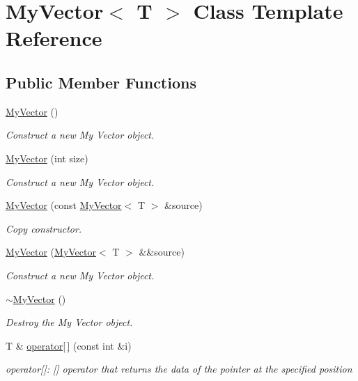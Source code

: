 \hypertarget{class_my_vector}{}\section{My\+Vector$<$ T $>$ Class Template Reference}
\label{class_my_vector}
\subsection*{Public Member Functions}
\begin{DoxyCompactItemize}
\item 
\mbox{\hyperlink{class_my_vector_ac356762c5ced52c0d934476cef32e472}{My\+Vector}} ()
\begin{DoxyCompactList}\small\item\em Construct a new My Vector object. \end{DoxyCompactList}\item 
\mbox{\hyperlink{class_my_vector_a9f780e2c6c6f35610a656b64395c6d1b}{My\+Vector}} (int size)
\begin{DoxyCompactList}\small\item\em Construct a new My Vector object. \end{DoxyCompactList}\item 
\mbox{\hyperlink{class_my_vector_aaf93995f4a267cc279867c10cfbef623}{My\+Vector}} (const \mbox{\hyperlink{class_my_vector}{My\+Vector}}$<$ T $>$ \&source)
\begin{DoxyCompactList}\small\item\em Copy constructor. \end{DoxyCompactList}\item 
\mbox{\hyperlink{class_my_vector_a7b2d4483f19b1ea3525e49336c857111}{My\+Vector}} (\mbox{\hyperlink{class_my_vector}{My\+Vector}}$<$ T $>$ \&\&source)
\begin{DoxyCompactList}\small\item\em Construct a new My Vector object. \end{DoxyCompactList}\item 
\mbox{\hyperlink{class_my_vector_abe59f181259ff63fa583f4bd87a9737e}{$\sim$\+My\+Vector}} ()
\begin{DoxyCompactList}\small\item\em Destroy the My Vector object. \end{DoxyCompactList}\item 
T \& \mbox{\hyperlink{class_my_vector_a52eca35ed558d978bf5a8541f9d0115c}{operator\mbox{[}$\,$\mbox{]}}} (const int \&i)
\begin{DoxyCompactList}\small\item\em operator\mbox{[}\mbox{]}\+: \mbox{[}\mbox{]} operator that returns the data of the pointer at the specified position \end{DoxyCompactList}\item 

\end{DoxyCompactItemize}
